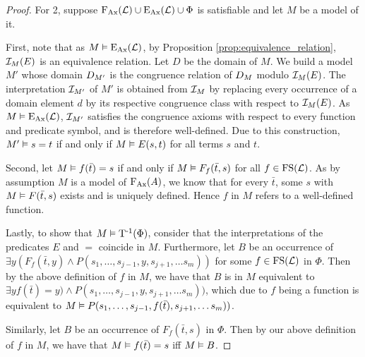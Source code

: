 \begin{proof}
	For 2, suppose $\operatorname{F_{Ax}}(\operatorname{\mathcal{L}}) \cup \operatorname{E_{Ax}}(\operatorname{\mathcal{L}}) \cup \Phi$ is satisfiable and let $M$ be a model of it.

	First, note that as $M \vDash \operatorname{E_{Ax}}(\operatorname{\mathcal{L}})$, by Proposition \ref{prop:equivalence_relation}, $\mathcal{I}_M(E)$ is an equivalence relation.
	Let $D$ be the domain of $M$.
	We build a model $M'$ whose domain $D_{M'}$ is the congruence relation of $D_{M}$ modulo $\mathcal{I}_{M}(E)$.
	The interpretation $\mathcal{I}_{M'}$ of $M'$ is obtained from $\mathcal{I}_{M}$ by 
	replacing every occurrence of a domain element $d$ by its respective congruence class with respect to $\mathcal{I}_{M}(E)$.
	As $M \vDash \operatorname{E_{Ax}}(\operatorname{\mathcal{L}})$, $\mathcal{I}_{M'}$ satisfies the congruence axioms with respect to every function and predicate symbol, and is therefore well-defined.
	Due to this construction, $M' \vDash s = t$ if and only if $M \vDash E(s, t)$ for all terms $s$ and $t$.



	Second, let $M\vDash f(\bar t) = s$ if and only if $M\vDash F_f(\bar t, s)$ for all $f \in \operatorname{FS}(\operatorname{\mathcal{L}})$.
	As by assumption $M$ is a model of $\operatorname{F_{Ax}}(A)$, we know that for every $\bar t$, some $s$ with $M\vDash F(\bar t, s)$ exists and is uniquely defined.
	Hence $f$ in $M$ refers to a well-defined function.

	Lastly, to show that $M \vDash \operatorname{T^{-1}}(\Phi)$, 
	consider that the interpretations of the predicates $E$ and $=$ coincide in $M$.
	Furthermore, let $B$ be an occurrence of $\exists y (F_f(\bar t, y) \land P(s_1, \ldots, s_{j-1}, y, s_{j+1}, \ldots s_m))$ for some $f \in \operatorname{FS}(\operatorname{\mathcal{L}})$ in $\Phi$.
	Then by the above definition of $f$ in $M$, we have that $B$ is in $M$ equivalent to $\exists y f(\bar t) = y) \land P(s_1, \ldots, s_{j-1}, y, s_{j+1}, \ldots s_m))$, which due to $f$ being a function is equivalent to 
	$M \vDash P(s_1, \ldots, s_{j-1}, f(\bar t), s_{j+1}, \ldots s_m))$.

	Similarly, let $B$ be an occurrence of $F_f(\bar t, s)$ in $\Phi$.
	Then by our above definition of $f$ in $M$, we have that $M \vDash f(\bar t) = s$ iff $M \vDash B$.
\end{proof}

